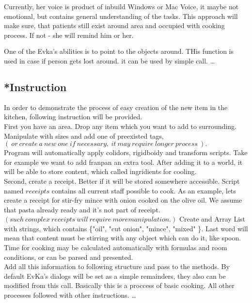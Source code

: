 \documentclass[18pt]{article}
\numberwithin{equation}{section} %
\numberwithin{figure}{section} %
\numberwithin{table}{section} %
\begin{document}
	Currently, her voice is product of inbuild Windows or Mac Voice, it maybe not emotional, but contains general understanding of the tasks. This approach will make sure, that patients still exist around area and occupied with cooking process. If not - she will remind him or her.
	
	
	One of the Evka's abilities is to point to the objects around. THis function is used in case if person gets lost around. it can be used by simple call. \ldots
	\subsection{*Instruction}
	
	In order to demonstrate the process of easy creation of the new item in the kitchen, following instruction will be provided.\\
	
	First you have an area. Drop any item which you want to add to surrounding. Manipulate with sizes and add one of preexisted tags, $\left(\ or\ create\ a\ new\ one\ if\ necessary,\ it\ may\ require\ longer\ process\  \right) . $ \\
	
	Program will automatically apply colidors, rigidboidy and transform scripts. Take for example we want to add franpan an extra tool. After adding it to a world, it will be able to store content, which called ingridients for cooling. \\
	
	Second, create a receipt. Better if it will be stored somewhere accessible. Script named $receipts$ contains all current staff possible to cook. As an example, lets create a receipt for stir-fry mince with onion cooked on the olive oil. We assume that pasta already ready and it's not part of receipt. $ \left(such\ complex\ receipts\ will\ require\ more manipulation.  \right) $ Create and Array List with strings, which contains \{"oil", "cut onion", "mince", "mixed" \}. Last word will mean that content must be stirring with any object which can do it, like spoon. Time for cooking may be calculated automatically with formulas and room conditions, or can be parsed and presented. \\
	
	Add all this information to following structure and pass to the methods. By default EvKa's dialogs will be set as a simple remainders, they also can be modified from this call. Basically this is a proccess of basic cooking. All other processes followed with other instructions. \ldots
	
\end{document}
